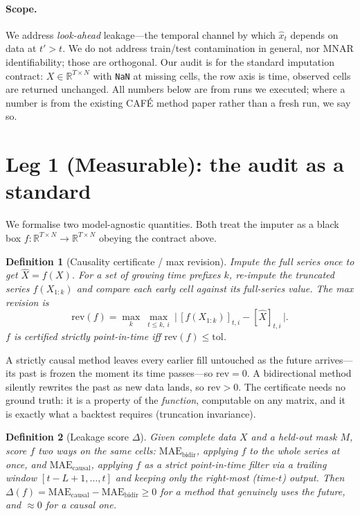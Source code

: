 \documentclass[10pt,twocolumn]{article}
\newcommand{\cafe}{CAF\'E}
\newtheorem{definition}{Definition}
\begin{document}
\paragraph{Scope.} We address \emph{look-ahead} leakage---the temporal channel by
which $\hat x_t$ depends on data at $t'>t$. We do not address train/test
contamination in general, nor MNAR identifiability; those are orthogonal. Our
audit is for the standard imputation contract: $X\in\mathbb{R}^{T\times N}$ with
\texttt{NaN} at missing cells, the row axis is time, observed cells are returned
unchanged. All numbers below are from runs we executed; where a number is from
the existing \cafe{} method paper rather than a fresh run, we say so.

\section{Leg 1 (Measurable): the audit as a standard}\label{sec:standard}
We formalise two model-agnostic quantities. Both treat the imputer as a black box
$f:\mathbb{R}^{T\times N}\!\to\!\mathbb{R}^{T\times N}$ obeying the contract above.

\begin{definition}[Causality certificate / max revision]\label{def:cert}
Impute the full series once to get $\hat X=f(X)$. For a set of growing time
prefixes $k$, re-impute the truncated series $f(X_{1:k})$ and compare each early
cell against its full-series value. The \emph{max revision} is
\[
  \mathrm{rev}(f)=\max_{k}\ \max_{t\le k,\ i}\
  \bigl|\,[f(X_{1:k})]_{t,i}-[\hat X]_{t,i}\,\bigr|.
\]
$f$ is \emph{certified strictly point-in-time} iff $\mathrm{rev}(f)\le\mathrm{tol}$.
\end{definition}

A strictly causal method leaves every earlier fill untouched as the future
arrives---its past is frozen the moment its time passes---so $\mathrm{rev}=0$.
A bidirectional method silently rewrites the past as new data lands, so
$\mathrm{rev}>0$. The certificate needs no ground truth: it is a property of the
\emph{function}, computable on any matrix, and it is exactly what a backtest
requires (truncation invariance).

\begin{definition}[Leakage score $\Delta$]\label{def:delta}
Given complete data $X$ and a held-out mask $M$, score $f$ two ways on the
\emph{same} cells: $\mathrm{MAE}_{\text{bidir}}$, applying $f$ to the whole series
at once, and $\mathrm{MAE}_{\text{causal}}$, applying $f$ as a strict
point-in-time filter via a trailing window $[t{-}L{+}1,\dots,t]$ and keeping only
the right-most (time-$t$) output. Then
$\Delta(f)=\mathrm{MAE}_{\text{causal}}-\mathrm{MAE}_{\text{bidir}}\ge 0$ for a
method that genuinely uses the future, and $\approx 0$ for a causal one.
\end{definition}
\end{document}
